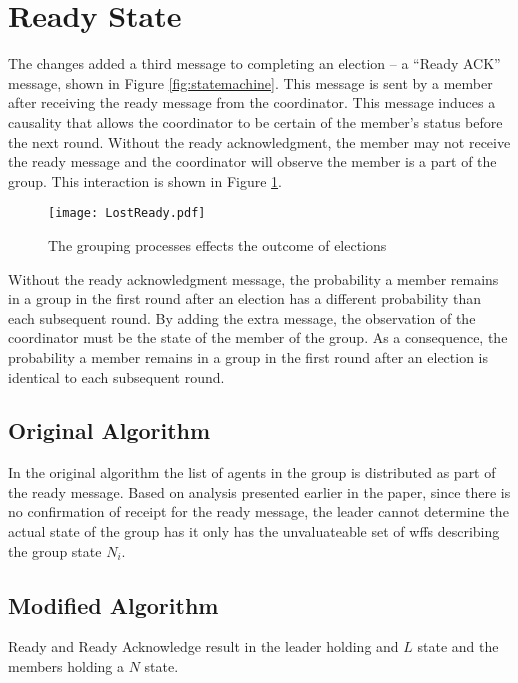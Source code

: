 \section{Ready State}

The changes added a third message to completing an election -- a ``Ready ACK'' message, shown in Figure \ref{fig:statemachine}.
This message is sent by a member after receiving the ready message from the coordinator.
This message induces a causality that allows the coordinator to be certain of the member's status before the next round.
Without the ready acknowledgment, the member may not receive the ready message and the coordinator will observe the member is a part of the group.
This interaction is shown in Figure \ref{fig:lostready}.

\begin{figure}
\begin{centering}
\texttt{[image: LostReady.pdf]}
\caption{The grouping processes effects the outcome of elections} \label{fig:lostready}
\end{centering}
\end{figure}

Without the ready acknowledgment message, the probability a member remains in a group in the first round after an election has a different probability than each subsequent round.
By adding the extra message, the observation of the coordinator must be the state of the member of the group.
As a consequence, the probability a member remains in a group in the first round after an election is identical to each subsequent round.

\subsection{Original Algorithm}

In the original algorithm the list of agents in the group is distributed as part of the ready message. Based on analysis presented earlier in the paper, since there is no confirmation of receipt for the ready message, the leader cannot determine the actual state of the group has it only has the unvaluateable set of wffs describing the group state $N_i$.

\subsection{Modified Algorithm}

\begin{thm}
Ready and Ready Acknowledge result in the leader holding and $L$ state and the members holding a $N$ state.
\end{thm}

